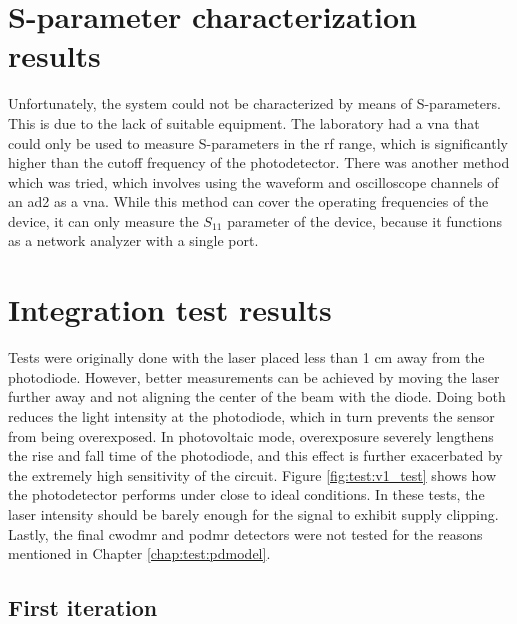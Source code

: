 \section{S-parameter characterization results}
Unfortunately, the system could not be characterized by means of S-parameters. This is due to the lack of suitable equipment. The laboratory had a \gls{vna} that could only be used to measure S-parameters in the \gls{rf} range, which is significantly higher than the cutoff frequency of the photodetector. There was another method which was tried, which involves using the waveform and oscilloscope channels of an \gls{ad2} as a \gls{vna}. While this method can cover the operating frequencies of the device, it can only measure the $S_{11}$ parameter of the device, because it functions as a network analyzer with a single port. %

\section{Integration test results}\label{chap:test:integ_res}
Tests were originally done with the laser placed less than 1 \unit{cm} away from the photodiode. However, better measurements can be achieved by moving the laser further away and not aligning the center of the beam with the diode. Doing both reduces the light intensity at the photodiode, which in turn prevents the sensor from being overexposed. In photovoltaic mode, overexposure severely lengthens the rise and fall time of the photodiode, and this effect is further exacerbated by the extremely high sensitivity of the circuit. Figure \ref{fig:test:v1_test} shows how the photodetector performs under close to ideal conditions. In these tests, the laser intensity should be barely enough for the signal to exhibit supply clipping. Lastly, the final \gls{cwodmr} and \gls{podmr} detectors were not tested for the reasons mentioned in Chapter \ref{chap:test:pdmodel}. 

\subsection{First iteration}

